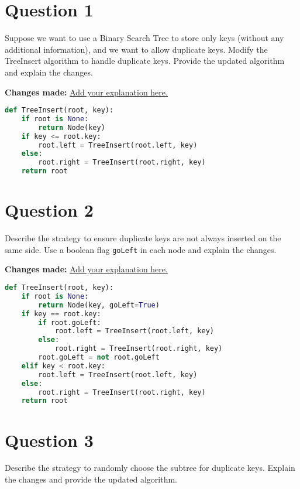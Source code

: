 \documentclass[12pt]{article}
\begin{document}
\renewcommand{\familydefault}{\rmdefault}

\section*{Question 1}
Suppose we want to use a Binary Search Tree to store only keys (without any additional information), and we want to allow duplicate keys. Modify the TreeInsert algorithm to handle duplicate keys. Provide the updated algorithm and explain the changes.

\vspace{1em} %
\textbf{Changes made:} \underline{Add your explanation here.}

\begin{lstlisting}[language=Python, caption={Modified TreeInsert Algorithm}]
def TreeInsert(root, key):
    if root is None:
        return Node(key)
    if key <= root.key:
        root.left = TreeInsert(root.left, key)
    else:
        root.right = TreeInsert(root.right, key)
    return root
\end{lstlisting}

\pagebreak

\section*{Question 2}
Describe the strategy to ensure duplicate keys are not always inserted on the same side. Use a boolean flag \texttt{goLeft} in each node and explain the changes.

\vspace{1em} %
\textbf{Changes made:} \underline{Add your explanation here.}

\begin{lstlisting}[language=Python, caption={Modified TreeInsert with goLeft Flag}]
def TreeInsert(root, key):
    if root is None:
        return Node(key, goLeft=True)
    if key == root.key:
        if root.goLeft:
            root.left = TreeInsert(root.left, key)
        else:
            root.right = TreeInsert(root.right, key)
        root.goLeft = not root.goLeft
    elif key < root.key:
        root.left = TreeInsert(root.left, key)
    else:
        root.right = TreeInsert(root.right, key)
    return root
\end{lstlisting}

\pagebreak

\section*{Question 3}
Describe the strategy to randomly choose the subtree for duplicate keys. Explain the changes and provide the updated algorithm.
\end{document}
